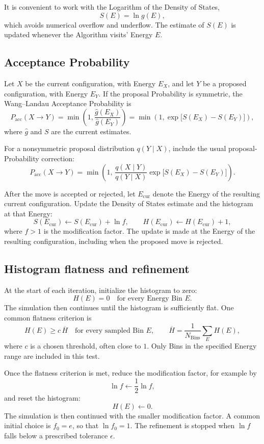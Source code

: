 \documentclass[a4paper, 10pt, onepage]{elegantbook}
\begin{document}
{It is convenient to work with the Logarithm of the Density of States,
\[
  S(E) = \ln g(E),
\]
which avoids numerical overflow and underflow. The estimate of \(S(E)\)
is updated whenever the Algorithm visits' Energy \(E\).

\subsection{Acceptance Probability}

Let \(X\) be the current configuration, with Energy \(E_X\), and let
\(Y\) be a proposed configuration, with Energy \(E_Y\). If the proposal
Probability is symmetric, the Wang--Landau Acceptance Probability is
\[
  P_{\mathrm{acc}}(X \to Y)
  =
  \min\left(1,\frac{\widehat{g}(E_X)}{\widehat{g}(E_Y)}\right)
  =
  \min\left(1,
      \exp\bigl[S(E_X)-S(E_Y)\bigr]\right),
\]
where \(\widehat{g}\) and \(S\) are the current estimates.

For a nonsymmetric proposal distribution \(q(Y\mid X)\), include the
usual proposal-Probability correction:
\[
  P_{\mathrm{acc}}(X \to Y)
  =
  \min\left(
    1,\,
    \frac{q(X\mid Y)}{q(Y\mid X)}
    \exp\bigl[S(E_X)-S(E_Y)\bigr]
  \right).
\]

After the move is accepted or rejected, let \(E_{\mathrm{cur}}\) denote
the Energy of the resulting current configuration. Update the Density
of States estimate and the histogram at that Energy:
\[
  S(E_{\mathrm{cur}})
  \leftarrow
  S(E_{\mathrm{cur}})+\ln f,
  \qquad
  H(E_{\mathrm{cur}})
  \leftarrow
  H(E_{\mathrm{cur}})+1,
\]
where \(f>1\) is the modification factor. The update is made at the
Energy of the resulting configuration, including when the proposed move
is rejected.

\subsection{Histogram flatness and refinement}

At the start of each iteration, initialize the histogram to zero:
\[
  H(E) = 0
  \quad\text{for every Energy Bin }E.
\]
The simulation then continues until the histogram is sufficiently flat.
One common flatness criterion is
\[
  H(E) \geq c\,\overline{H}
  \quad\text{for every sampled Bin }E,
  \qquad
  \overline{H}
  =
  \frac{1}{N_{\mathrm{Bins}}}
  \sum_E H(E),
\]
where \(c\) is a chosen threshold, often close to \(1\). Only Bins in
the specified Energy range are included in this test.

Once the flatness criterion is met, reduce the modification factor,
for example by
\[
  \ln f \leftarrow \frac{1}{2}\ln f,
\]
and reset the histogram:
\[
  H(E) \leftarrow 0.
\]
The simulation is then continued with the smaller modification factor.
A common initial choice is \(f_0=e\), so that \(\ln f_0=1\). The
refinement is stopped when \(\ln f\) falls below a prescribed tolerance
\(\epsilon\).

}
\end{document}
